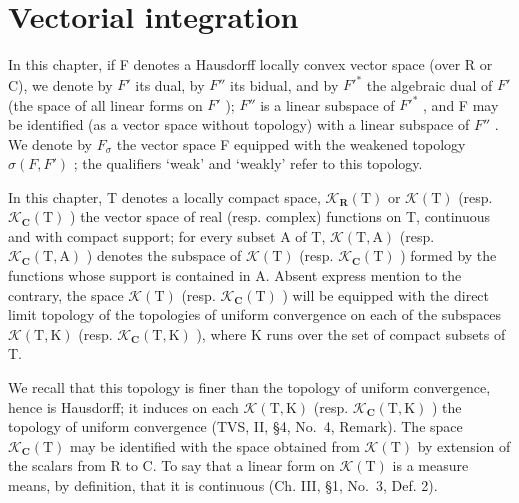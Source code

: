 \chapter{Vectorial integration}

In this chapter, if F denotes a Hausdorff locally convex vector space (over R or C), we denote by \(F'\) its dual, by \(F''\) its bidual, and by \(F'^*\) the algebraic dual of \(F'\) (the space of all linear forms on \(F'\) ); \(F''\) is a linear subspace of \(F'^*\) , and F may be identified (as a vector space without topology) with a linear subspace of \(F''\) . We denote by \(F_\sigma\) the vector space F equipped with the weakened topology \(\sigma(F, F')\) ; the qualifiers `weak' and `weakly' refer to this topology.

In this chapter, T denotes a locally compact space, \(\mathcal{K}_{\mathbf{R}}(\mathrm{T})\) or \(\mathcal{K}(\mathrm{T})\) (resp. \(\mathcal{K}_{\mathbf{C}}(\mathrm{T})\) ) the vector space of real (resp. complex) functions on T, continuous and with compact support; for every subset A of T, \(\mathcal{K}(\mathrm{T},\mathrm{A})\) (resp. \(\mathcal{K}_{\mathbf{C}}(\mathrm{T},\mathrm{A})\) ) denotes the subspace of \(\mathcal{K}(\mathrm{T})\) (resp. \(\mathcal{K}_{\mathbf{C}}(\mathrm{T})\) ) formed by the functions whose support is contained in A. Absent express mention to the contrary, the space \(\mathcal{K}(\mathrm{T})\) (resp. \(\mathcal{K}_{\mathbf{C}}(\mathrm{T})\) ) will be equipped with the direct limit topology of the topologies of uniform convergence on each of the subspaces \(\mathcal{K}(\mathrm{T},\mathrm{K})\) (resp. \(\mathcal{K}_{\mathbf{C}}(\mathrm{T},\mathrm{K})\) ), where K runs over the set of compact subsets of T.

We recall that this topology is finer than the topology of uniform convergence, hence is Hausdorff; it induces on each \(\mathcal{K}(\mathrm{T},\mathrm{K})\) (resp. \(\mathcal{K}_{\mathbf{C}}(\mathrm{T},\mathrm{K})\) ) the topology of uniform convergence (TVS, II, §4, No.~4, Remark). The space \(\mathcal{K}_{\mathbf{C}}(\mathrm{T})\) may be identified with the space obtained from \(\mathcal{K}(\mathrm{T})\) by extension of the scalars from R to C. To say that a linear form on \(\mathcal{K}(\mathrm{T})\) is a measure means, by definition, that it is continuous (Ch. III, §1, No.~3, Def. 2).

